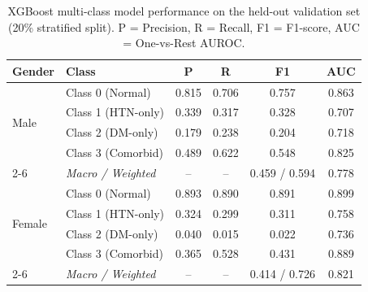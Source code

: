 \begin{table}[ht]
\centering
\caption{XGBoost multi-class model performance on the held-out validation set (20\% stratified split). P = Precision, R = Recall, F1 = F1-score, AUC = One-vs-Rest AUROC.}
\label{tab:model_performance}
\begin{tabular}{llcccc}
\toprule
Gender & Class & P & R & F1 & AUC \\
\midrule
  \multirow{4}{*}{Male} & Class 0 (Normal) & 0.815 & 0.706 & 0.757 & 0.863 \\
   & Class 1 (HTN-only) & 0.339 & 0.317 & 0.328 & 0.707 \\
   & Class 2 (DM-only) & 0.179 & 0.238 & 0.204 & 0.718 \\
   & Class 3 (Comorbid) & 0.489 & 0.622 & 0.548 & 0.825 \\
  \cmidrule(lr){2-6}
  & \textit{Macro / Weighted} & -- & -- & 0.459 / 0.594 & 0.778 \\
  \midrule
  \multirow{4}{*}{Female} & Class 0 (Normal) & 0.893 & 0.890 & 0.891 & 0.899 \\
   & Class 1 (HTN-only) & 0.324 & 0.299 & 0.311 & 0.758 \\
   & Class 2 (DM-only) & 0.040 & 0.015 & 0.022 & 0.736 \\
   & Class 3 (Comorbid) & 0.365 & 0.528 & 0.431 & 0.889 \\
  \cmidrule(lr){2-6}
  & \textit{Macro / Weighted} & -- & -- & 0.414 / 0.726 & 0.821 \\
  \midrule
\bottomrule
\end{tabular}
\end{table}